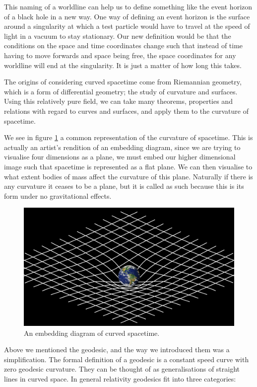 \documentclass[oneside,openright,frontopenright, singlespacing]{dmathesis}
\begin{document}
\vspace{1em}
	This naming of a worldline can help us to define something like the event horizon of a black hole in a new way. One way of defining an event horizon is the surface around a singularity at which a test particle would have to travel at the speed of light in a vacuum to stay stationary. Our new definition would be that the conditions on the space and time coordinates change such that instead of time having to move forwards and space being free, the space coordinates for any worldline will end at the singularity. It is just a matter of how long this takes.

\vspace{1em}
	The origins of considering curved spacetime come from Riemannian geometry, which is a form of differential geometry; the study of curvature and surfaces. Using this relatively pure field, we can take many theorems, properties and relations with regard to curves and surfaces, and apply them to the curvature of spacetime.

\vspace{1em}
		We see in figure \ref{fig:Figure2.1} a common representation of the curvature of spacetime. This is actually an artist's rendition of an embedding diagram, since we are trying to visualise four dimensions as a plane, we must embed our higher dimensional image such that spacetime is represented as a flat plane. We can then visualise to what extent bodies of mass affect the curvature of this plane. Naturally if there is any curvature it ceases to be a plane, but it is called as such because this is its form under no gravitational effects.

\begin{figure}[!ht]
	\centering
	\includegraphics[width=0.5\linewidth]{img/curved-spacetime}
	\caption{An embedding diagram of curved spacetime.}
	\label{fig:Figure2.1}
\end{figure}

\vspace{1em}
	Above we mentioned the geodesic, and the way we introduced them was a simplification. The formal definition of a geodesic is a constant speed curve with zero geodesic curvature. They can be thought of as generalisations of straight lines in curved space. In general relativity geodesics fit into three categories:
\end{document}
